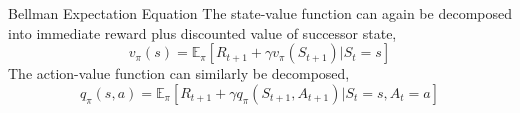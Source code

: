 \bgroup
\begin{frame}{Bellman Expectation Equation}
The state-value function can again be decomposed into immediate reward plus discounted value of successor state,
\begin{equation*}
v_{\pi}(s) = \mathbb{E}_{\pi}[R_{t+1} + \gamma v_{\pi}(S_{t+1}) | S_t = s]
\end{equation*}
The action-value function can similarly be decomposed,
\begin{equation*}
q_{\pi}(s, a) = \mathbb{E}_{\pi}[R_{t+1} + \gamma q_{\pi}(S_{t+1}, A_{t+1}) | S_t = s, A_t = a]
\end{equation*}
\end{frame}
\egroup